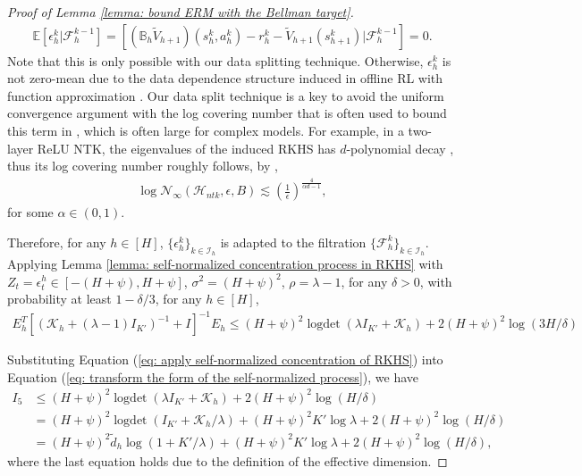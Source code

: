 \documentclass{article} \usepackage{iclr2023/iclr2023_conference,times}
\DeclareMathOperator*{\logdet}{logdet}
\begin{document}
\begin{proof}[Proof of Lemma \ref{lemma: bound ERM with the Bellman target}]
\begin{align*}
    \mathbb{E} \left[ \epsilon^k_h | \mathcal{F}^{k-1}_h \right] = \left[ (\mathbb{B}_h \tilde{V}_{h+1})(s^k_h, a^k_h) - r^k_h - \tilde{V}_{h+1}(s^k_{h+1}) | \mathcal{F}^{k-1}_h\right] = 0. 
\end{align*}
Note that this is only possible with our data splitting technique. Otherwise, $\epsilon^k_h$ is not zero-mean due to the data dependence structure induced in offline RL with function approximation \citep{nguyentang2021sample}. Our data split technique is a key to avoid the uniform convergence argument with the log covering number that is often used to bound this term in \cite{jin2021pessimism}, which is often large for complex models. For example, in a two-layer ReLU NTK, the eigenvalues of the induced RKHS has $d$-polynomial decay \citep{bietti2019inductive}, thus its log covering number roughly follows, by \citep[Lemma~D1]{yang2020function},
\begin{align*}
    \log \mathcal{N}_{\infty}(\mathcal{H}_{ntk}, \epsilon, B) \lesssim \left( \frac{1}{\epsilon} \right)^{\frac{4}{\alpha d -1}},
\end{align*}
for some $\alpha \in (0,1)$. 

Therefore, for any $h \in [H]$, $\{\epsilon^k_h\}_{k \in \mathcal{I}_h}$ is adapted to the filtration $\{\mathcal{F}_h^{k}\}_{k \in \mathcal{I}_h}$. Applying Lemma \ref{lemma: self-normalized concentration process in RKHS} with $Z_t = \epsilon_t^h \in [-(H + \psi), H + \psi]$, $\sigma^2 = (H + \psi)^2$, $\rho = \lambda - 1$, for any $\delta > 0$, with probability at least $1 - \delta / 3$, for any $h \in [H]$, 
\begin{align}
    E^T_h \left[(\mathcal{K}_h + (\lambda - 1) I_{K'})^{-1} + I \right]^{-1} E_h \leq (H + \psi)^2 \logdet \left(\lambda I_{K'} + \mathcal{K}_h \right) + 2 (H + \psi)^2 \log (3 H / \delta)
    \label{eq: apply self-normalized concentration of RKHS}
\end{align}

Substituting Equation (\ref{eq: apply self-normalized concentration of RKHS}) into Equation (\ref{eq: transform the form of the self-normalized process}), we have 
\begin{align}
    I_5 &\leq (H + \psi)^2 \logdet (\lambda I_{K'} + \mathcal{K}_h) + 2 (H + \psi)^2 \log (H / \delta) \nonumber \\ 
    &=  (H + \psi)^2 \logdet ( I_{K'} + \mathcal{K}_h /\lambda) + (H + \psi)^2 K' \log \lambda + 2 (H + \psi)^2 \log (H / \delta) \nonumber \\
    &= (H + \psi)^2 \tilde{d}_h \log (1 + K' / \lambda) + (H + \psi)^2 K' \log \lambda + 2 (H + \psi)^2 \log (H / \delta),
    \label{eq: bound of self-normalized process with NTK kernel}
\end{align}
where the last equation holds due to the definition of the effective dimension. 




\end{proof}
\end{document}
